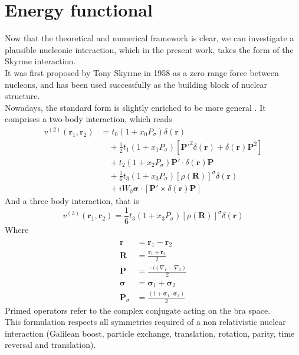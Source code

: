 \chapter{Energy functional}
Now that the theoretical and numerical framework is clear, we can investigate a plausible nucleonic interaction, which in the present work, takes the form of the Skyrme interaction.
\\It was first proposed by Tony Skyrme in 1958 \cite{SKYRME1958615} as a zero range force between nucleons, and has been used successfully as the building block of nuclear structure.
\\Nowadays, the standard form is slightly enriched to be more general \cite{CHABANAT1997710}. It comprises a two-body interaction, which reads
\begin{align}
v^{(2)}(\mathbf{r}_1, \mathbf{r}_2) &= t_0 \left(1 + x_0 P_\sigma \right) \delta(\mathbf{r}) \\
&\quad + \frac{1}{2} t_1 \left(1 + x_1 P_\sigma \right) \left[ \mathbf{P}'^2 \delta(\mathbf{r}) + \delta(\mathbf{r}) \mathbf{P}^2 \right] \\
&\quad + t_2 \left(1 + x_2 P_\sigma \right) \mathbf{P}' \cdot \delta(\mathbf{r}) \mathbf{P} \\
&\quad + \frac{1}{6} t_3 \left(1 + x_3 P_\sigma \right) \left[ \rho(\mathbf{R}) \right]^\sigma \delta(\mathbf{r}) \\
&\quad + i W_0 \boldsymbol{\sigma}\cdot \left[ \mathbf{P}' \times \delta(\mathbf{r}) \mathbf{P} \right]
\end{align}
And a three body interaction, that is
\begin{equation}
v^{(3)}(\mathbf r_1, \mathbf r_2)=\frac 1 6 t_3 \left(1 + x_3 P_\sigma \right) \left[ \rho(\mathbf{R}) \right]^\sigma \delta(\mathbf{r}) 
\end{equation}
Where 
\begin{align*}
\\\mathbf{r} &= \mathbf{r}_1 - \mathbf{r}_2
\\\mathbf{R} &= \frac{\mathbf{r}_1+\mathbf{r}_2}{2}
\\\mathbf{P} &= \frac{-i(\nabla_1 - \nabla_2)}{2}
\\\boldsymbol{\sigma} &= \boldsymbol{\sigma}_1 + \boldsymbol{\sigma}_2
\\\mathbf{P}_\sigma &= \frac{(1+\boldsymbol{\sigma}_1\cdot\boldsymbol{\sigma}_2)}{2}
\end{align*}
Primed operators refer to the complex conjugate acting on the bra space.
\\This formulation respects all symmetries required of a non relativistic nuclear interaction (Galilean boost, particle exchange, translation, rotation, parity, time reversal and translation).
